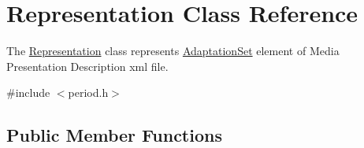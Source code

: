 \hypertarget{class_representation}{\section{Representation Class Reference}
\label{class_representation}
}


The \hyperlink{class_representation}{Representation} class represents \hyperlink{class_adaptation_set}{Adaptation\-Set} element of Media Presentation Description xml file.  




{\ttfamily \#include $<$period.\-h$>$}

\subsection*{Public Member Functions}
